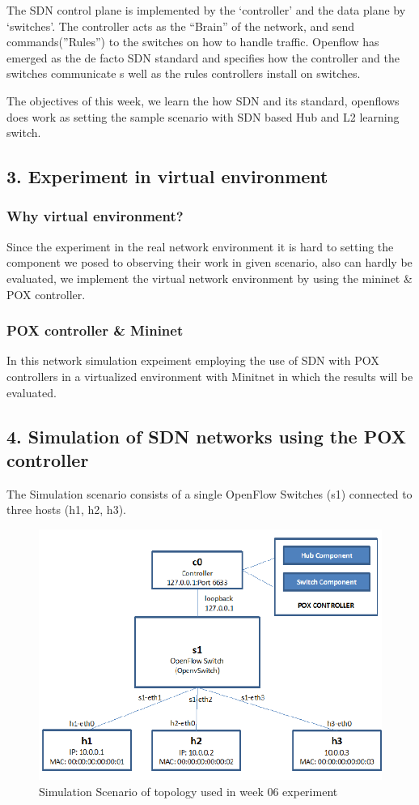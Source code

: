 The SDN control plane is implemented by the ‘controller’ and the data plane by ‘switches’. The controller acts as the “Brain” of the network, and send commands(”Rules”) to the switches on how to handle traffic. 
Openflow has emerged as the de facto SDN standard and specifies how the controller and the switches communicate s well as the rules controllers install on switches.

The objectives of this week, we learn the how SDN and its standard, openflows does work as setting the sample scenario with SDN based Hub and L2 learning switch. 

\subsection*{3. Experiment in virtual environment}
\subsubsection*{Why virtual environment?}
Since the experiment in the real network environment it is hard to setting the component we posed to observing their work in given scenario, also can hardly be evaluated, we implement the virtual network environment by using the mininet \& POX controller.  
\subsubsection*{POX controller \& Mininet}
In this network simulation expeiment employing the use of SDN with POX controllers in a virtualized environment with Minitnet in which the results will be evaluated.
\subsection*{4. Simulation of SDN networks using the POX controller}
The Simulation scenario consists of a single OpenFlow Switches (s1) connected to three hosts (h1, h2, h3).\\
\vspace{-4mm}
\begin{figure}[!h]\centering 
	\includegraphics[width=.55\textwidth]{image/week06/0-1.png}
	\caption{\footnotesize 
	Simulation Scenario of topology used in week 06 experiment}
	\vspace{-10pt}
\end{figure}

